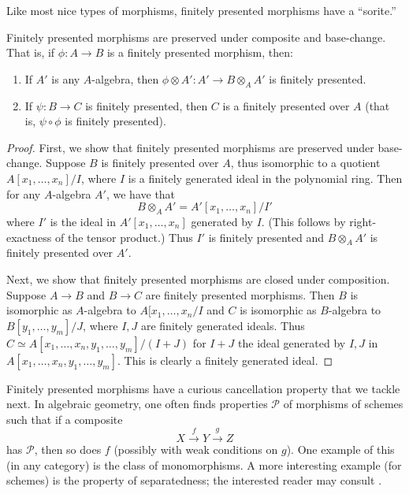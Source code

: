 Like most nice types of morphisms, finitely presented morphisms have a
``sorite.''
\begin{proposition} \label{soritefp}
Finitely presented morphisms are preserved under composite and base-change.
That is, if $\phi: A \to B$ is a finitely presented morphism, then:
\begin{enumerate}
\item If $A'$ is any $A$-algebra, then $\phi \otimes A': A' \to B \otimes_A
A'$ is finitely presented. 
\item If $\psi: B \to C$ is finitely presented, then $C$ is a finitely
presented over $A$ (that is, $\psi \circ \phi$ is finitely presented).
\end{enumerate}
\end{proposition} 
\begin{proof} 
First, we show that finitely presented morphisms are preserved under base-change. 
Suppose $B$ is finitely presented over $A$, thus isomorphic to a quotient $A[x_1, \dots,
x_n]/I$, where $I$ is a finitely generated ideal in the polynomial ring. Then
for any $A$-algebra $A'$, we have that 
\[ B \otimes_A A' = A'[x_1, \dots, x_n]/ I'  \]
where $I'$ is the ideal in $A'[x_1, \dots, x_n]$ generated by $I$. (This
follows by right-exactness of the tensor product.) Thus $I'$ is finitely
presented and $B \otimes_A A'$ is finitely presented over $A'$.

Next, we show that finitely presented morphisms are closed under composition.
Suppose $A \to B$ and $B \to C$ are finitely presented morphisms. Then $B$ is isomorphic as
$A$-algebra to $A[x_1, \dots, x_n/I$ and $C$ is isomorphic as $B$-algebra to
$B[y_1, \dots, y_m]/J$, where $I, J$ are finitely generated ideals.
Thus $C \simeq A[x_1, \dots, x_n, y_1, \dots, y_m]/(I+J)$ for $I+J$ the ideal
generated by $I, J$ in $A[x_1, \dots, x_n, y_1, \dots, y_m]$.  This is clearly a
finitely generated ideal.
\end{proof} 

Finitely presented morphisms have a curious cancellation property that we
tackle next. In algebraic geometry, one often finds properties $\mathcal{P}$ of morphisms 
of schemes such that if a composite
\[ X \stackrel{f}{\to} Y \stackrel{g}{\to} Z \]
has $\mathcal{P}$, then so does $f$ (possibly with weak conditions on $g$). 
One example of this (in any category) is the class of monomorphisms.  A more
interesting example (for schemes) is the property of separatedness; the
interested reader
may consult \cite{EGA}.


